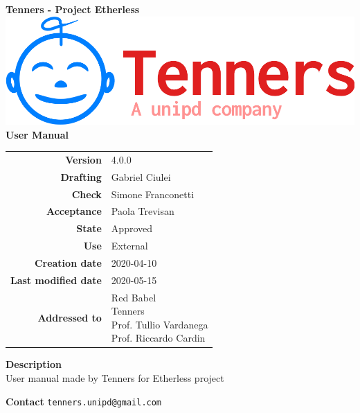 \begin{titlepage}
	\begin{center}
		\large \textbf{Tenners - Project Etherless}
		\vfill
		\includegraphics[scale = 0.3]{./res/img/logo.png}\\
		\vfill
		\Huge \textbf{User Manual}

        \vfill
        \large

        \begin{tabular}{r|l}
                        \textbf{Version} & 4.0.0 \\
                        \textbf{Drafting} &
                        Gabriel Ciulei\\
                        \textbf{Check} &
                        Simone Franconetti\\
                        \textbf{Acceptance} &
                        Paola Trevisan\\
                        \textbf{State} & Approved \\
                        \textbf{Use} & External\\
                        \textbf{Creation date} &  2020-04-10\\
                        \textbf{Last modified date} &  2020-05-15\\
                        \textbf{Addressed to} & \parbox[t]{5cm}{Red Babel \\Tenners \\Prof. Tullio Vardanega \\Prof. Riccardo Cardin
                        							}
                \end{tabular}
                \vfill
                \normalsize
                \vfill
                                \textbf{Description}
                \\User manual made by Tenners for Etherless project
                \vfill
                \normalsize
                \vfill
                
                \textbf{Contact}
                \texttt{tenners.unipd@gmail.com}

	\end{center}
\end{titlepage}
